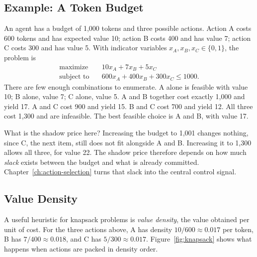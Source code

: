 \documentclass[11pt]{book}
\begin{document}
\subsection{Example: A Token Budget}

An agent has a budget of 1{,}000 tokens and three possible actions. Action A costs 600 tokens and has expected value 10; action B costs 400 and has value 7; action C costs 300 and has value 5. With indicator variables $x_A, x_B, x_C \in \{0,1\}$, the problem is
\begin{align*}
\text{maximize} \quad & 10 x_A + 7 x_B + 5 x_C \\
\text{subject to} \quad & 600 x_A + 400 x_B + 300 x_C \leq 1000.
\end{align*}
There are few enough combinations to enumerate. A alone is feasible with value 10; B alone, value 7; C alone, value 5. A and B together cost exactly 1{,}000 and yield 17. A and C cost 900 and yield 15. B and C cost 700 and yield 12. All three cost 1{,}300 and are infeasible. The best feasible choice is A and B, with value 17.

What is the shadow price here? Increasing the budget to 1{,}001 changes nothing, since C, the next item, still does not fit alongside A and B. Increasing it to 1{,}300 allows all three, for value 22. The shadow price therefore depends on how much \emph{slack} exists between the budget and what is already committed. Chapter~\ref{ch:action-selection} turns that slack into the central control signal.

\subsection{Value Density}

A useful heuristic for knapsack problems is \emph{value density}, the value obtained per unit of cost. For the three actions above, A has density $10/600 \approx 0.017$ per token, B has $7/400 \approx 0.018$, and C has $5/300 \approx 0.017$. Figure~\ref{fig:knapsack} shows what happens when actions are packed in density order.
\end{document}
